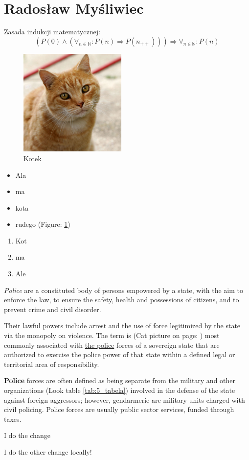 \section {Radosław Myśliwiec}

Zasada indukcji matematycznej:
$$ (P(0) \land (\forall_{n \in \mathbb{N}} : P(n) \Rightarrow P(n_{++}))) 
\Rightarrow \forall_{n \in \mathbb{N}} : P(n) $$

\begin{figure} [htpb]
    \centering
    \includegraphics[width=200px]{pictures/cat.jpg}
    \caption{Kotek}
    \label{kot}
\end{figure}



\begin{itemize}
    \item Ala
    \item ma
    \item kota
    \item rudego (Figure: \ref{kot})
\end{itemize}

\begin{enumerate}
    \item Kot
    \item ma
    \item Ale
\end{enumerate}

\emph{Police} are a constituted body of persons empowered by a state, with the aim 
to enforce the law, to ensure the safety, health and possessions of citizens, 
and to prevent crime and civil disorder.

Their lawful powers include arrest and the use of force legitimized by the 
state via the monopoly on violence. The term is (Cat picture on page: \pageref{kot}) 
most commonly associated with 
\underline{the police} forces of a sovereign state that are authorized to exercise the police 
power of that state within a defined legal or territorial area of responsibility. 

\textbf{Police} forces are often defined as being separate from the military and 
other organizations (Look table \ref{tab:5_tabela}) involved in the defense of the 
state against foreign 
aggressors; however, gendarmerie are military units charged with civil policing. 
Police forces are usually public sector services, funded through taxes.

I do the change

I do the other change locally!